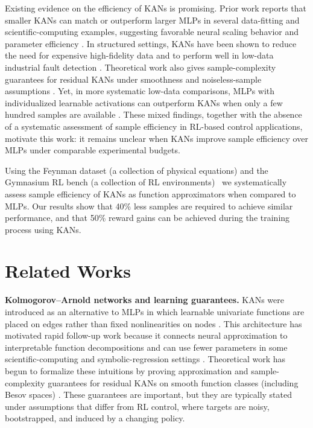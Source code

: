 \documentclass{article}
\begin{document}
Existing evidence on the efficiency of KANs is promising.
Prior work reports that smaller KANs can match or outperform larger MLPs in several data-fitting and scientific-computing examples, suggesting favorable neural scaling behavior and parameter efficiency \cite{liu2024kan}.
In structured settings, KANs have been shown to reduce the need for expensive high-fidelity data and to perform well in low-data industrial fault detection \cite{howard2024multifidelity,villagomez2025kanae,wang2025quadkan}.
Theoretical work also gives sample-complexity guarantees for residual KANs under smoothness and noiseless-sample assumptions \cite{kratsios2025besov}.
Yet, in more systematic low-data comparisons, MLPs with individualized learnable activations can outperform KANs when only a few hundred samples are available \cite{pourkamali2025lowdata}.
These mixed findings, together with the absence of a systematic assessment of sample efficiency in RL-based control applications, motivate this work: it remains unclear when KANs improve sample efficiency over MLPs under comparable experimental budgets.

Using the Feynman dataset (a collection of physical equations) and the Gymnasium RL bench (a collection of RL environments)~\citep{towers2026gymnasium} we systematically assess sample efficiency of KANs as function approximators when compared to MLPs. 
Our results show that 40\% less samples are required to achieve similar performance, and that 50\% reward gains can be achieved during the training process using KANs.  





\section{Related Works}

\textbf{Kolmogorov--Arnold networks and learning guarantees.}
KANs were introduced as an alternative to MLPs in which learnable univariate functions are placed on edges rather than fixed nonlinearities on nodes \cite{liu2024kan}.
This architecture has motivated rapid follow-up work because it connects neural approximation to interpretable function decompositions and can use fewer parameters in some scientific-computing and symbolic-regression settings \cite{somvanshi2025survey,essahraui2025kanoverview}.
Theoretical work has begun to formalize these intuitions by proving approximation and sample-complexity guarantees for residual KANs on smooth function classes (including Besov spaces) \cite{kratsios2025besov}.
These guarantees are important, but they are typically stated under assumptions that differ from RL control, where targets are noisy, bootstrapped, and induced by a changing policy.
\end{document}
